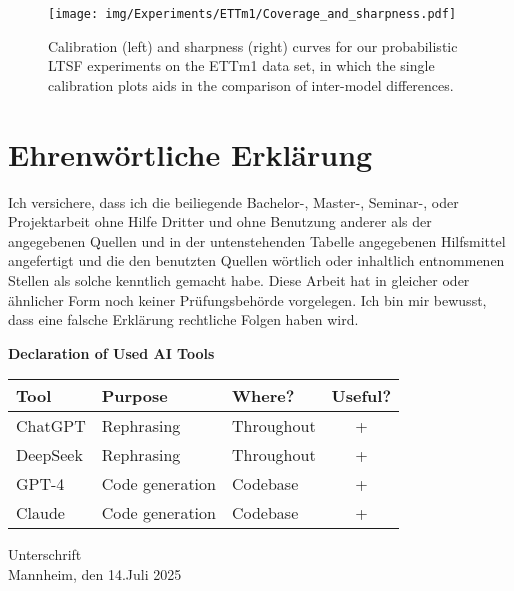 \documentclass[a4paper,oneside,bibliography=totoc]{scrbook}
\begin{document}
\begin{figure}
    \centering
    \texttt{[image: img/Experiments/ETTm1/Coverage\_and\_sharpness.pdf]}
    \caption{Calibration (left) and sharpness (right) curves for our probabilistic LTSF experiments on the ETTm1 data set, in which the single calibration plots aids in the comparison of inter-model differences.}
    \label{fig:cov_sha_ettm1_2}
\end{figure}





\backmatter
\chapter{Ehrenwörtliche Erklärung}

Ich versichere, dass ich die beiliegende Bachelor-, Master-, Seminar-, oder
Projektarbeit ohne Hilfe Dritter und ohne Benutzung anderer als der angegebenen
Quellen und in der untenstehenden Tabelle angegebenen Hilfsmittel angefertigt
und die den benutzten Quellen wörtlich oder inhaltlich entnommenen Stellen als
solche kenntlich gemacht habe. Diese Arbeit hat in gleicher oder ähnlicher Form
noch keiner Prüfungsbehörde vorgelegen. Ich bin mir bewusst, dass eine falsche
Erklärung rechtliche Folgen haben wird.

\begin{center}
  \textbf{Declaration of Used AI Tools} \\[.3em]
  \begin{tabularx}{\textwidth}{lXlc}
    \toprule
    Tool & Purpose & Where? & Useful? \\
    \midrule
    ChatGPT & Rephrasing & Throughout & + \\
    DeepSeek & Rephrasing & Throughout & + \\
    GPT-4 & Code generation & Codebase & + \\
    Claude & Code generation & Codebase & + \\
    \bottomrule
  \end{tabularx}
\end{center}

\vspace{2cm}
\noindent Unterschrift\\
\noindent Mannheim, den 14.Juli 2025 \hfill
\end{document}
